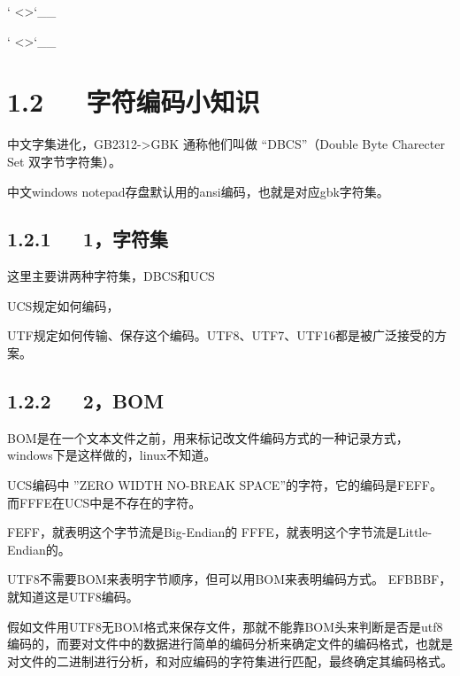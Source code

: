 \documentclass[letterpaper,12pt,english]{sphinxmanual}
\begin{document}


{}` \textless{}\textgreater{}{}`\_\_

{}` \textless{}\textgreater{}{}`\_\_


\section{1.2   字符编码小知识}
\label{\detokenize{004.study/001._u7f16_u7a0b/_u5b57_u7b26_u6587_u4ef6_u7f16_u7801:id3}}
中文字集进化，GB2312-\textgreater{}GBK 通称他们叫做 “DBCS”（Double Byte Charecter Set 双字节字符集）。

中文windows notepad存盘默认用的ansi编码，也就是对应gbk字符集。


\subsection{1.2.1   1，字符集}
\label{\detokenize{004.study/001._u7f16_u7a0b/_u5b57_u7b26_u6587_u4ef6_u7f16_u7801:id4}}
这里主要讲两种字符集，DBCS和UCS

UCS规定如何编码，

UTF规定如何传输、保存这个编码。UTF8、UTF7、UTF16都是被广泛接受的方案。


\subsection{1.2.2   2，BOM}
\label{\detokenize{004.study/001._u7f16_u7a0b/_u5b57_u7b26_u6587_u4ef6_u7f16_u7801:bom}}
BOM是在一个文本文件之前，用来标记改文件编码方式的一种记录方式，windows下是这样做的，linux不知道。

UCS编码中 ”ZERO WIDTH NO-BREAK SPACE”的字符，它的编码是FEFF。而FFFE在UCS中是不存在的字符。

FEFF，就表明这个字节流是Big-Endian的
FFFE，就表明这个字节流是Little-Endian的。

UTF8不需要BOM来表明字节顺序，但可以用BOM来表明编码方式。
EFBBBF，就知道这是UTF8编码。

假如文件用UTF8无BOM格式来保存文件，那就不能靠BOM头来判断是否是utf8编码的，而要对文件中的数据进行简单的编码分析来确定文件的编码格式，也就是对文件的二进制进行分析，和对应编码的字符集进行匹配，最终确定其编码格式。
\end{document}
